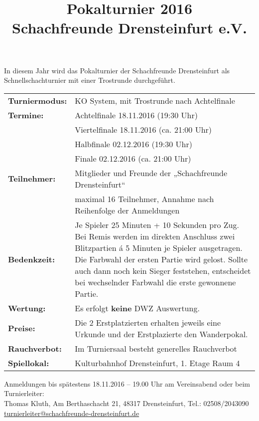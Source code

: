 \documentclass[a4paper,parskip=full-,DIV18]{scrartcl}
\title{Pokalturnier 2016\\Schachfreunde Drensteinfurt e.V.}
\date{}
\begin{document}
\maketitle

In diesem Jahr wird das Pokalturnier der Schachfreunde Drensteinfurt als Schnellschachturnier mit einer Trostrunde durchgeführt.

\bigskip

\begin{tabular}{p{3 cm} p{13.5 cm}}
	\textbf{Turniermodus:} & KO System, mit Trostrunde nach Achtelfinale          \\
	\textbf{Termine:}      & Achtelfinale 18.11.2016 (19:30 Uhr)                  \\
	                       & Viertelfinale 18.11.2016 (ca. 21:00 Uhr)             \\
	                       & Halbfinale 02.12.2016 (19:30 Uhr)                    \\
	                       & Finale 02.12.2016 (ca. 21:00 Uhr)                    \\
	\textbf{Teilnehmer:}   & Mitglieder und Freunde der „Schachfreunde Drensteinfurt“ \\
	\textbf{}             & maximal 16 Teilnehmer, Annahme nach Reihenfolge der Anmeldungen \\
	\textbf{Bedenkzeit:}             & Je Spieler 25 Minuten + 10 Sekunden pro Zug. Bei Remis werden im direkten Anschluss zwei Blitzpartien á 5 Minuten je Spieler ausgetragen. Die Farbwahl der ersten Partie wird gelost. Sollte auch dann noch kein Sieger feststehen, entscheidet bei wechselnder Farbwahl die erste gewonnene Partie. \\
	\textbf{Wertung:}             & Es erfolgt \textbf{keine} DWZ Auswertung. \\
	\textbf{Preise:}             & Die 2 Erstplatzierten erhalten jeweils eine Urkunde und der Erstplazierte den Wanderpokal. \\
	\textbf{Rauchverbot:}             & Im Turniersaal besteht generelles Rauchverbot \\
	\textbf{Spiellokal:}             & Kulturbahnhof Drensteinfurt, 1. Etage Raum 4
\end{tabular}


\bigskip

Anmeldungen bis spätestens 18.11.2016 – 19.00 Uhr am Vereinsabend oder beim Turnierleiter:\\
Thomas Kluth, Am Berthaschacht 21, 48317 Drensteinfurt, Tel.: 02508/2043090\\
\href{mailto:turnierleiter@schachfreunde-drensteinfurt.de}{turnierleiter@schachfreunde-drensteinfurt.de}
\end{document}

